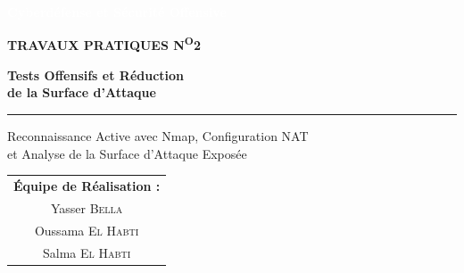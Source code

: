 \documentclass[12pt,a4paper,openany]{report}
\begin{document}
	\sloppy
	
	\begin{titlepage}
		\thispagestyle{empty}
		
		\noindent
		\colorbox{primary}{%
			\parbox{\dimexpr\textwidth-2\fboxsep}{%
				\vspace{0.6cm}
				\centering
				{\large\bfseries\textcolor{white}{Cyberdéfense et Sécurité Offensive}}\\[0.6cm]
			}%
		}
		
		\vspace{1.5cm}
		\centering
		
		{\normalsize\bfseries\color{black!40}\MakeUppercase{Travaux Pratiques N\textsuperscript{o}2}}
		
		\vspace{0.8cm}
		
		{\Huge\bfseries\color{primary}
			Tests Offensifs et Réduction\\[0.2cm]
			de la Surface d'Attaque\par
		}
		
		\vspace{0.5cm}
		
		{\color{accent}\rule{7cm}{1.5pt}\par}
		
		\vspace{0.5cm}
		
		{\large\color{black!60}
			Reconnaissance Active avec Nmap, Configuration NAT\\[0.2cm]
			et Analyse de la Surface d'Attaque Exposée\par
		}
		
		\vspace{2cm}
		
		{\large
			\renewcommand{\arraystretch}{1.5}
			\begin{tabular}{c}
				\textbf{\color{primary}Équipe de Réalisation :}\\[0.3cm]
				Yasser \textsc{Bella} \\
				Oussama \textsc{El Habti} \\
				Salma \textsc{El Habti} \\[0.6cm]
				

\end{tabular}}
\end{titlepage}
\end{document}
